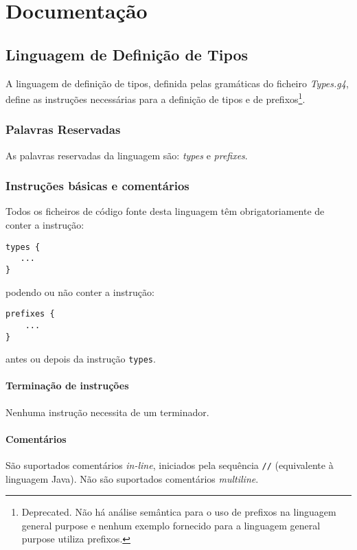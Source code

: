 \documentclass{report}
\begin{document}
\chapter{Documentação}
\label{chap.documentacao}

\section{Linguagem de Definição de Tipos}
\label{chap.documentacao.sec.types}
A linguagem de definição de tipos, definida pelas gramáticas do ficheiro \textit{Types.g4}, define as instruções necessárias para a definição de tipos e de prefixos\footnote{Deprecated. Não há análise semântica para o uso de prefixos na linguagem general purpose e nenhum exemplo fornecido para a linguagem general purpose utiliza prefixos.}.

\subsection{Palavras Reservadas}
As palavras reservadas da linguagem são: \textit{types} e \textit{prefixes}.

\subsection{Instruções básicas e comentários}
Todos os ficheiros de código fonte desta linguagem têm obrigatoriamente de conter a instrução:
\begin{lstlisting}[caption= Linguagem de Definição de Tipos - Instrução \texttt{types \{...\} }]
types {
   ... 
}
\end{lstlisting}
podendo ou não conter a instrução:
\begin{lstlisting}[caption= Linguagem de Definição de Tipos - Instrução \texttt{prefixes \{...\} }]
prefixes {
    ...
}
\end{lstlisting}
antes ou depois da instrução \texttt{types}.

\subsubsection{Terminação de instruções}
Nenhuma instrução necessita de um terminador.

\subsubsection{Comentários}
São suportados comentários \textit{in-line}, iniciados pela sequência \texttt{//} (equivalente à linguagem Java). Não são suportados comentários \textit{multiline}.
\end{document}
